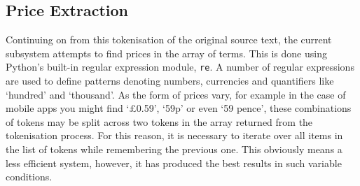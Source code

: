 \subsection{Price Extraction}
Continuing on from this tokenisation of the original source text, the current subsystem attempts to find prices in the array of terms. This is done using Python's built-in regular expression module,
 \texttt{re}. %
A number of regular expressions are used to define patterns denoting numbers, currencies and quantifiers like `hundred' and `thousand'. As the form of prices vary, for example in the case of mobile apps you might find `£0.59', `59p' or even `59 pence', these combinations of tokens may be split across two tokens in the array returned from the tokenisation process. For this reason, it is necessary to iterate over all items in the list of tokens while remembering the previous one. This obviously means a less efficient system, however, it has produced the best results in such variable conditions.



